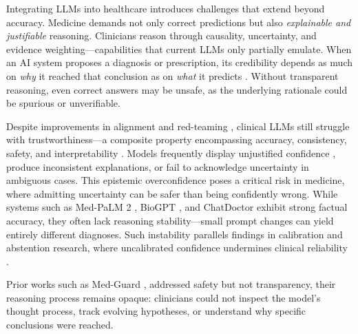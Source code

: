\documentclass[letterpaper]{article} %
\begin{document}
Integrating LLMs into healthcare introduces challenges that extend beyond accuracy. Medicine demands not only correct predictions but also \emph{explainable and justifiable} reasoning. Clinicians reason through causality, uncertainty, and evidence weighting—capabilities that current LLMs only partially emulate. When an AI system proposes a diagnosis or prescription, its credibility depends as much on \emph{why} it reached that conclusion as on \emph{what} it predicts \cite{tonekaboni2019clinicians,amann2020explainability}. Without transparent reasoning, even correct answers may be unsafe, as the underlying rationale could be spurious or unverifiable.

Despite improvements in alignment and red-teaming \cite{mei2023assert}, clinical LLMs still struggle with trustworthiness—a composite property encompassing accuracy, consistency, safety, and interpretability \cite{a2019,huang2025survey}. Models frequently display unjustified confidence \cite{kadavath2022language}, produce inconsistent explanations, or fail to acknowledge uncertainty in ambiguous cases. This epistemic overconfidence poses a critical risk in medicine, where admitting uncertainty can be safer than being confidently wrong. While systems such as Med-PaLM 2 \cite{singhal2025toward}, BioGPT \cite{luo2022biogpt}, and ChatDoctor \cite{li2023chatdoctor} exhibit strong factual accuracy, they often lack reasoning stability—small prompt changes can yield entirely different diagnoses. Such instability parallels findings in calibration and abstention research, where uncalibrated confidence undermines clinical reliability \cite{guo2017calibration,malinin2020uncertainty}.


Prior works such as Med-Guard \cite{jain2025medguard}, addressed safety but not transparency, their reasoning process remains opaque: clinicians could not inspect the model’s thought process, track evolving hypotheses, or understand why specific conclusions were reached.
\end{document}
